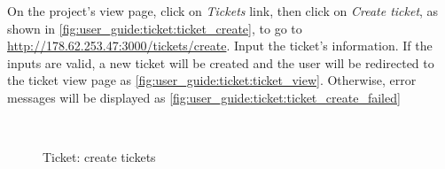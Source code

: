 On the project's view page, click on \emph{Tickets} link, then click on \emph{Create ticket}, as shown in \autoref{fig:user_guide:ticket:ticket_create}, to go to \href{http://178.62.253.47:3000/tickets/create}{http://178.62.253.47:3000/tickets/create}.
Input the ticket's information.
If the inputs are valid, a new ticket will be created and the user will be redirected to the ticket view page as \autoref{fig:user_guide:ticket:ticket_view}.
Otherwise, error messages will be displayed as \autoref{fig:user_guide:ticket:ticket_create_failed}

\begin{figure}[bth]
\myfloatalign
{} \quad
{} \\
\caption[Ticket: create tickets]{Ticket: create tickets}
\label{fig:user_guide:ticket:ticket_create}
\end{figure}

